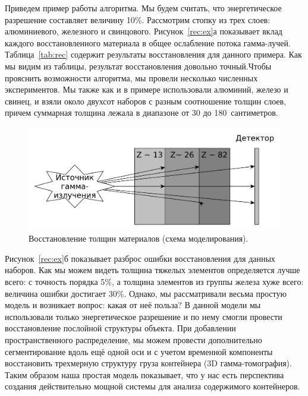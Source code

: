 \documentclass[a4paper]{panl}
\begin{document}
Приведем пример работы алгоритма. Мы будем считать, что энергетическое разрешение составляет величину 10\%. Рассмотрим стопку из трех слоев: алюминиевого, железного и свинцового. Рисунок~\ref{rec:ex}а показывает вклад каждого восстановленного материала в общее ослабление потока гамма-лучей. Таблица~\ref{tab:rec} содержит результаты восстановления для данного примера. Как мы видим из таблицы, результат восстановления довольно точный.Чтобы прояснить возможности алгоритма, мы провели несколько численных экспериментов. Мы также как и в примере использовали алюминий, железо и свинец, и взяли около двухсот наборов с разным соотношение толщин слоев, причем суммарная толщина лежала в диапазоне от 30 до 180~сантиметров.
\begin{figure} 
    \includegraphics[width=\linewidth]{yed_schema_2.pdf}
    \vspace{-3mm}
    \caption{Восстановление толщин материалов (схема моделирования).}
    \vspace{-5mm}
\end{figure}
Рисунок~\ref{rec:ex}б показывает разброс ошибки восстановления для данных наборов. Как мы можем видеть толщина тяжелых элементов определяется лучше всего: с точность порядка 5\%, а толщина элементов из группы железа хуже всего: величина ошибки достигает 30\%. Однако, мы рассматривали весьма простую модель и возникает вопрос: какая от неё польза? В данной модели мы использовали только энергетическое разрешение и по нему смогли провести восстановление послойной структуры объекта. При добавлении пространственного распределение, мы можем провести дополнительно сегментирование вдоль ещё одной оси и с учетом временной компоненты восстановить трехмерную структуру груза контейнера (3D гамма-томография). Таким образом наша простая модель показывает, что у нас есть перспектива создания действительно мощной системы для анализа содержимого контейнеров.
\end{document}
